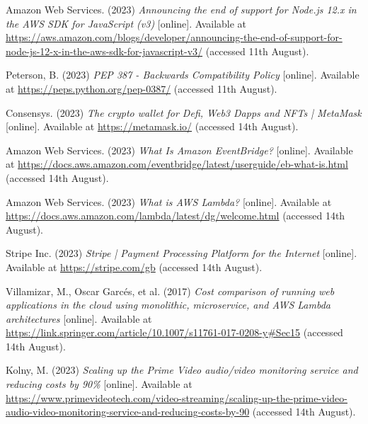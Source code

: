  \noindent [16] Amazon Web Services. (2023) \textit{Announcing the end of support for Node.js 12.x in the AWS SDK for JavaScript (v3)} [online]. Available at \url{https://aws.amazon.com/blogs/developer/announcing-the-end-of-support-for-node-js-12-x-in-the-aws-sdk-for-javascript-v3/} (accessed 11th August).
 \vspace{0.2cm}

 \noindent [17] Peterson, B. (2023) \textit{PEP 387 - Backwards Compatibility Policy} [online]. Available at \url{https://peps.python.org/pep-0387/} (accessed 11th August).
 \vspace{0.2cm}

 \noindent [18] Consensys. (2023) \textit{The crypto wallet for Defi, Web3 Dapps and NFTs | MetaMask} [online]. Available at \url{https://metamask.io/} (accessed 14th August).
 \vspace{0.2cm}

 \noindent [19] Amazon Web Services. (2023) \textit{What Is Amazon EventBridge?} [online]. Available at \url{https://docs.aws.amazon.com/eventbridge/latest/userguide/eb-what-is.html} (accessed 14th August).
 \vspace{0.2cm}

 \noindent [20] Amazon Web Services. (2023) \textit{What is AWS Lambda?} [online]. Available at \url{https://docs.aws.amazon.com/lambda/latest/dg/welcome.html} (accessed 14th August).
 \vspace{0.2cm}

 \noindent [21] Stripe Inc. (2023) \textit{Stripe | Payment Processing Platform for the Internet} [online]. Available at \url{https://stripe.com/gb} (accessed 14th August).
 \vspace{0.2cm}

 \noindent [22] Villamizar, M., Oscar Garcés, et al. (2017) \textit{Cost comparison of running web applications in the cloud using monolithic, microservice, and AWS Lambda architectures} [online]. Available at \url{https://link.springer.com/article/10.1007/s11761-017-0208-y#Sec15} (accessed 14th August).
 \vspace{0.2cm}

 \noindent [23] Kolny, M. (2023) \textit{Scaling up the Prime Video audio/video monitoring service and reducing costs by 90\%} [online]. Available at \url{https://www.primevideotech.com/video-streaming/scaling-up-the-prime-video-audio-video-monitoring-service-and-reducing-costs-by-90} (accessed 14th August).
 \vspace{0.2cm}

